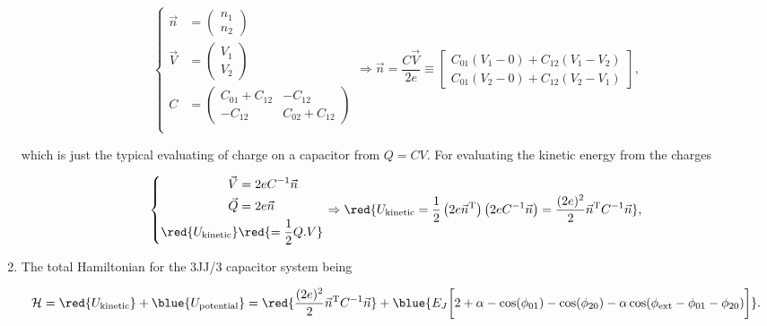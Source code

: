 \begin{enumerate}
  \begin{equation}
	  \left\lbrace \begin{aligned}
		  \vec{n} & = \left(\begin{smallmatrix}
		  n_1\\n_2
		  \end{smallmatrix}\right)\\
		  \vec{V} & =\left(\begin{smallmatrix}
		  V_1\\V_2
		  \end{smallmatrix}\right)\\
		  C & = \left(\begin{smallmatrix}
		  C_{01}+C_{12} & -C_{12}\\-C_{12} &C_{02}+C_{12}
		  \end{smallmatrix}\right)\\
	  \end{aligned}\right. \Rightarrow \vec{n} = \frac{C\vec{V}}{2e} \equiv \begin{bmatrix}
	  	C_{01}\left(V_1-0\right) + C_{12}\left(V_1-V_2\right)\\ 	C_{01}\left(V_2-0\right) + C_{12}\left(V_2-V_1\right)
	  \end{bmatrix},
  \end{equation}
  
  \noindent which is just the typical evaluating of charge on a capacitor from $ Q = CV $. For evaluating the kinetic energy from the charges
  
  \begin{equation}
	  \left\lbrace \begin{aligned}
		  \vec{V} & = 2eC^{-1}\vec{n}\\
		  \vec{Q} & = 2e\vec{n}\\
		  \red{U_{\text{kinetic}}} & \red{= \frac{1}{2}Q.V}\\
	  \end{aligned}\right. \Rightarrow \red{U_{\text{kinetic}} = \frac{1}{2}\left(2e\vec{n}^{\text{T}}\right)\left(2eC^{-1}\vec{n}\right) = \frac{(2e)^2}{2}\vec{n}^{\text{T}}C^{-1}\vec{n}},
  \end{equation}
  
  
   \item The total Hamiltonian for the 3JJ/3 capacitor system being
  
  \begin{equation}
  	\label{eqn:l23JJ}
  	\mathcal{H} = \red{U_{\text{kinetic}}} + \blue{U_{\text{potential}}} = \red{\frac{(2e)^2}{2}\vec{n}^{\text{T}}C^{-1}\vec{n}} + \blue{E_J\bigg[2+\alpha - \cos(\phi_{01}) - \cos(\phi_{20}) - \alpha\cos(\phi_\text{ext}-\phi_{01} - \phi_{20})\bigg]}.
  \end{equation}
  

\end{enumerate}
